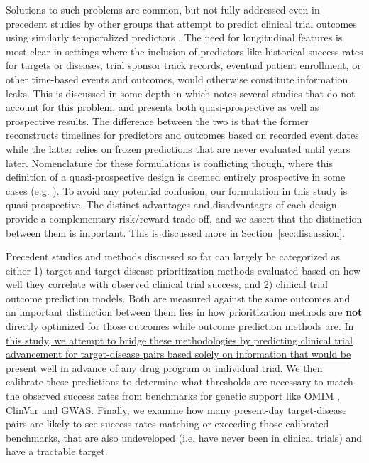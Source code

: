 \documentclass{article}
\begin{document}
Solutions to such problems are common, but not fully addressed even in precedent studies by other groups that attempt to predict clinical trial outcomes using similarly temporalized predictors \cite{PMID:37483175, PMID:34430930, Lo2019Machine}. The need for longitudinal features is most clear in settings where the inclusion of predictors like historical success rates for targets or diseases, trial sponsor track records, eventual patient enrollment, or other time-based events and outcomes, would otherwise constitute information leaks. This is discussed in some depth in \cite{PMID:37483175} which notes several studies that do not account for this problem, and presents both quasi-prospective as well as prospective results. The difference between the two is that the former reconstructs timelines for predictors and outcomes based on recorded event dates while the latter relies on frozen predictions that are never evaluated until years later. Nomenclature for these formulations is conflicting though, where this definition of a quasi-prospective design is deemed entirely prospective in some cases (e.g. \cite{PMID:37225853}). To avoid any potential confusion, our formulation in this study is quasi-prospective. The distinct advantages and disadvantages of each design provide a complementary risk/reward trade-off, and we assert that the distinction between them is important. This is discussed more in Section~\ref{sec:discussion}.

Precedent studies and methods discussed so far can largely be categorized as either 1) target and target-disease prioritization methods evaluated based on how well they correlate with observed clinical trial success, and 2) clinical trial outcome prediction models. Both are measured against the same outcomes and an important distinction between them lies in how prioritization methods are \textbf{not} directly optimized for those outcomes while outcome prediction methods are. \ul{In this study, we attempt to bridge these methodologies by predicting clinical trial advancement for target-disease pairs based solely on information that would be present well in advance of any drug program or individual trial}. We then calibrate these predictions to determine what thresholds are necessary to match the observed success rates from benchmarks for genetic support like OMIM \cite{PMID:15608251}, ClinVar \cite{PMID:24234437} and GWAS. Finally, we examine how many present-day target-disease pairs are likely to see success rates matching or exceeding those calibrated benchmarks, that are also undeveloped (i.e. have never been in clinical trials) and have a tractable target.
\end{document}
